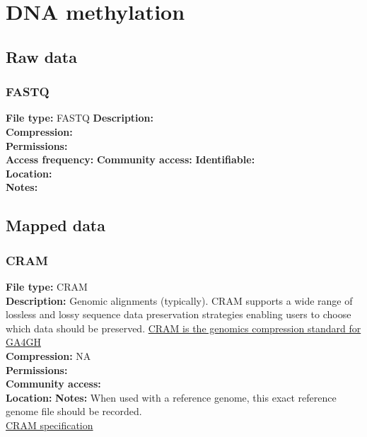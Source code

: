 \documentclass[
]{book}
\begin{document}
\hypertarget{dna-methylation}{%
\chapter{DNA methylation}\label{dna-methylation}}

\hypertarget{raw-data}{%
\section{Raw data}\label{raw-data}}

\hypertarget{fastq}{%
\subsection{FASTQ}\label{fastq}}

\textbf{File type:} FASTQ
\textbf{Description:}\\
\textbf{Compression:}\\
\textbf{Permissions:}\\
\textbf{Access frequency:}
\textbf{Community access:}
\textbf{Identifiable:}\\
\textbf{Location:}\\
\textbf{Notes:}

\hypertarget{mapped-data}{%
\section{Mapped data}\label{mapped-data}}

\hypertarget{cram-1}{%
\subsection{CRAM}\label{cram-1}}

\textbf{File type:} CRAM\\
\textbf{Description:} Genomic alignments (typically). CRAM supports a wide
range of lossless and lossy sequence data preservation strategies enabling users to choose which data should be preserved. \href{https://www.ga4gh.org/cram/}{CRAM is the genomics compression standard for GA4GH}\\
\textbf{Compression:} NA\\
\textbf{Permissions:}\\
\textbf{Community access:}\\
\textbf{Location:}
\textbf{Notes:} When used with a reference genome, this exact reference genome file should be recorded.\\
\href{https://samtools.github.io/hts-specs/CRAMv3.pdf}{CRAM specification}
\end{document}
